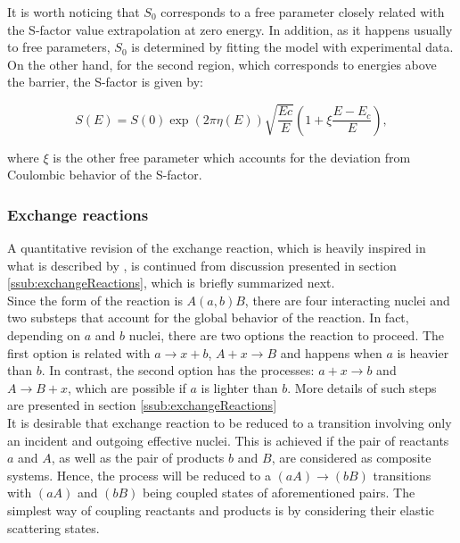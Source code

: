 \documentclass[openany]{book}
\begin{document}
It is worth noticing that $S_0$ corresponds to a free parameter closely related with the S-factor value extrapolation at zero energy. In addition, as it happens usually to free parameters, $S_0$ is determined by fitting the model with experimental data. \\

On the other hand, for the second region, which corresponds to energies above the barrier, the S-factor is given by:

\begin{equation}  \label{eq:potential_Yakovlev_sfactor_aboveBarrier}
	S(E) = S(0) \exp ({2\pi\eta(E)}) \sqrt{\frac{Ec}{E}} \left( 1 + \xi\frac{E - E_c}{E} \right),
\end{equation}

where $\xi$ is the other free parameter which accounts for the deviation from Coulombic behavior of the S-factor.  \\

\subsubsection{Exchange reactions} \label{ssub:potential_calculations_exchange}

A quantitative revision of the exchange reaction, which is heavily inspired in what is described by \cite{xu_takahashi_goriely_arnould_ohta_utsunomiya_2013}, is continued from discussion presented in section \ref{ssub:exchangeReactions}, which is briefly summarized next. \\

Since the form of the reaction is $A(a, b)B$, there are four interacting nuclei and two substeps that account for the global behavior of the reaction. In fact, depending on  $a$ and $b$ nuclei, there are two options the reaction to proceed. The first option is related with $ a \rightarrow x + b$,  $A + x \rightarrow B$ and happens when $a$ is heavier than $b$. In contrast, the second option has the processes: $a + x \rightarrow b$ and $A \rightarrow B + x$, which are possible if $a$ is lighter than $b$. More details of such steps are presented in section \ref{ssub:exchangeReactions} \\

It is desirable that exchange reaction to be reduced to a transition involving only an incident and outgoing effective nuclei. This is achieved if the pair of reactants $a$ and $A$, as well as the pair of products $b$ and $B$, are considered as composite systems. Hence, the process will be reduced to a $(aA) \rightarrow (bB)$ transitions with $(aA)$ and $(bB)$ being coupled states of aforementioned pairs. The simplest way of coupling reactants and products is by considering their elastic scattering states. \\
\end{document}
